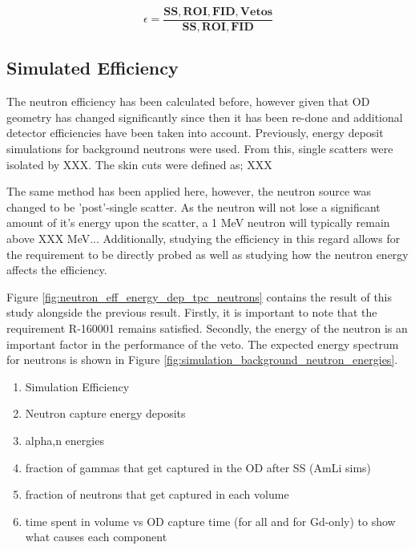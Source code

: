 \begin{equation}
    \epsilon = \frac{\mathbf{SS, ROI, FID, Vetos}}{\mathbf{SS, ROI, FID}}
    \label{eq:neutron_efficiency}
\end{equation}


\subsection{Simulated Efficiency}
\par
The neutron efficiency has been calculated before, however given that OD geometry has changed significantly since then it has been re-done and additional detector efficiencies have been taken into account.
Previously, energy deposit simulations for background neutrons were used. 
From this, single scatters were isolated by XXX.
The skin cuts were defined as; XXX


\par
The same method has been applied here, however, the neutron source was changed to be 'post'-single scatter. 
As the neutron will not lose a significant amount of it's energy upon the scatter, a 1 MeV neutron will typically remain above XXX MeV...
Additionally, studying the efficiency in this regard allows for the requirement to be directly probed as well as studying how the neutron energy affects the efficiency.

\par
Figure \ref{fig:neutron_eff_energy_dep_tpc_neutrons} contains the result of this study alongside the previous result.
Firstly, it is important to note that the requirement R-160001 remains satisfied.
Secondly, the energy of the neutron is an important factor in the performance of the veto.
The expected energy spectrum for neutrons is shown in Figure \ref{fig:simulation_background_neutron_energies}.


\begin{tcolorbox}[colback=red!5!white, colframe=red!50!black, title=Key Plots]
\begin{enumerate}
    \item Simulation Efficiency
    \item Neutron capture energy deposits
    \item alpha,n energies
    \item fraction of gammas that get captured in the OD after SS (AmLi sims)
    \item fraction of neutrons that get captured in each volume
    \item time spent in volume vs OD capture time (for all and for Gd-only) to show what causes each component
\end{enumerate}
\end{tcolorbox}

